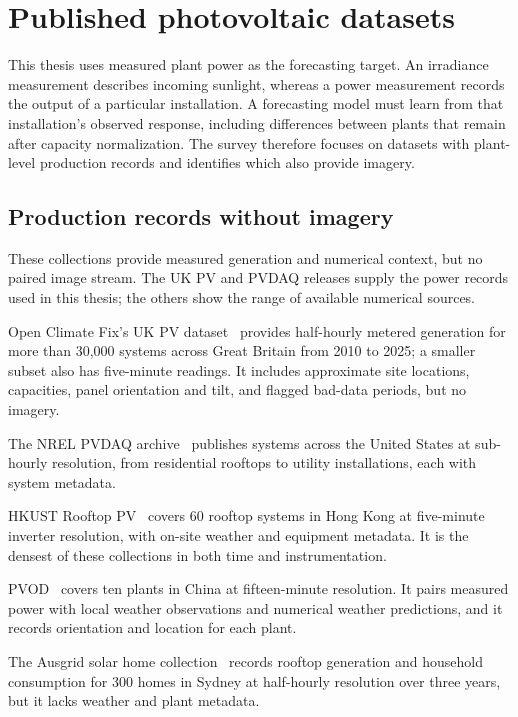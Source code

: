 \section{Published photovoltaic datasets}

This thesis uses measured plant power as the forecasting target. An irradiance measurement describes incoming sunlight, whereas a power measurement records the output of a particular installation. A forecasting model must learn from that installation's observed response, including differences between plants that remain after capacity normalization. The survey therefore focuses on datasets with plant-level production records and identifies which also provide imagery.

\subsection{Production records without imagery}
These collections provide measured generation and numerical context, but no paired image stream. The UK PV and PVDAQ releases supply the power records used in this thesis; the others show the range of available numerical sources.

Open Climate Fix's UK PV dataset~\cite{ukpv} provides half-hourly metered generation for more than 30,000 systems across Great Britain from 2010 to 2025; a smaller subset also has five-minute readings. It includes approximate site locations, capacities, panel orientation and tilt, and flagged bad-data periods, but no imagery.

The NREL PVDAQ archive~\cite{pvdaq} publishes systems across the United States at sub-hourly resolution, from residential rooftops to utility installations, each with system metadata.

HKUST Rooftop PV~\cite{hkpvdata} covers 60 rooftop systems in Hong Kong at five-minute inverter resolution, with on-site weather and equipment metadata. It is the densest of these collections in both time and instrumentation.

PVOD~\cite{pvod} covers ten plants in China at fifteen-minute resolution. It pairs measured power with local weather observations and numerical weather predictions, and it records orientation and location for each plant.

The Ausgrid solar home collection~\cite{ausgrid} records rooftop generation and household consumption for 300 homes in Sydney at half-hourly resolution over three years, but it lacks weather and plant metadata.

